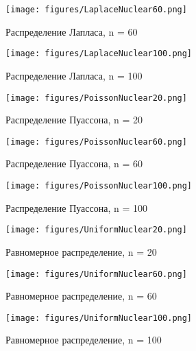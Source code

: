 \documentclass[../main.tex]{subfiles}
\begin{document}
    \begin{figure}[H]
        \centering
        \texttt{[image: figures/LaplaceNuclear60.png]}
        \caption{Распределение Лапласа, n = 60}
        \label{fig:normal}
    \end{figure}
    
    \begin{figure}[H]
        \centering
        \texttt{[image: figures/LaplaceNuclear100.png]}
        \caption{Распределение Лапласа, n = 100}
        \label{fig:normal}
    \end{figure}
    
    \begin{figure}[H]
        \centering
        \texttt{[image: figures/PoissonNuclear20.png]}
        \caption{Распределение Пуассона, n = 20}
        \label{fig:normal}
    \end{figure}
    
    \begin{figure}[H]
        \centering
        \texttt{[image: figures/PoissonNuclear60.png]}
        \caption{Распределение Пуассона, n = 60}
        \label{fig:normal}
    \end{figure}
    
    \begin{figure}[H]
        \centering
        \texttt{[image: figures/PoissonNuclear100.png]}
        \caption{Распределение Пуассона, n = 100}
        \label{fig:normal}
    \end{figure}
    
    \begin{figure}[H]
        \centering
        \texttt{[image: figures/UniformNuclear20.png]}
        \caption{Равномерное распределение, n = 20}
        \label{fig:normal}
    \end{figure}
    
    \begin{figure}[H]
        \centering
        \texttt{[image: figures/UniformNuclear60.png]}
        \caption{Равномерное распределение, n = 60}
        \label{fig:normal}
    \end{figure}
    
    \begin{figure}[H]
        \centering
        \texttt{[image: figures/UniformNuclear100.png]}
        \caption{Равномерное распределение, n = 100}
        \label{fig:normal}
    \end{figure}
\end{document}
